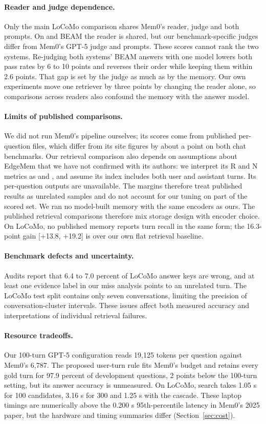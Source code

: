 \paragraph{Reader and judge dependence.} Only the main LoCoMo comparison shares Mem0's reader, judge and both prompts. On \lmes{} and BEAM the reader is shared, but our benchmark-specific judges differ from Mem0's GPT-5 judge and prompts. These scores cannot rank the two systems. Re-judging both systems' BEAM answers with one model lowers both pass rates by 6 to 10 points and reverses their order while keeping them within 2.6 points. That gap is set by the judge as much as by the memory. Our own experiments move one retriever by three points by changing the reader alone, so comparisons across readers also confound the memory with the answer model.

\paragraph{Limits of published comparisons.} We did not run Mem0's pipeline ourselves; its scores come from published per-question files, which differ from its site figures by about a point on both chat benchmarks. Our \lmes{} retrieval comparison also depends on assumptions about EdgeMem that we have not confirmed with its authors: we interpret its R and N metrics as  and , and assume its index includes both user and assistant turns. Its per-question outputs are unavailable. The margins therefore treat published results as unrelated samples and do not account for our tuning on part of the scored set. We ran no model-built memory with the same encoders as ours. The published retrieval comparisons therefore mix storage design with encoder choice. On LoCoMo, no published memory reports turn recall in the same form; the 16.3-point gain [+13.8, +19.2] is over our own flat retrieval baseline.

\paragraph{Benchmark defects and uncertainty.} Audits report that 6.4 to 7.0 percent of LoCoMo answer keys are wrong, and at least one evidence label in our miss analysis points to an unrelated turn. The LoCoMo test split contains only seven conversations, limiting the precision of conversation-cluster intervals. These issues affect both measured accuracy and interpretations of individual retrieval failures.

\paragraph{Resource tradeoffs.} Our 100-turn GPT-5 \lmes{} configuration reads 19,125 tokens per question against Mem0's 6,787. The proposed user-turn rule fits Mem0's budget and retains every gold turn for 97.9 percent of development questions, 2 points below the 100-turn setting, but its answer accuracy is unmeasured. On LoCoMo, search takes 1.05 s for 100 candidates, 3.16 s for 300 and 1.25 s with the cascade. These laptop timings are numerically above the 0.200 s 95th-percentile latency in Mem0's 2025 paper, but the hardware and timing summaries differ (Section~\ref{sec:cost}).

